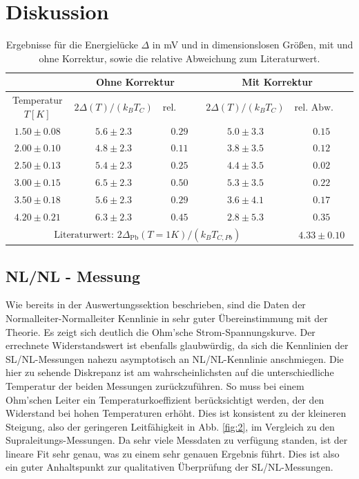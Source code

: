 \documentclass[twoside,        %
               BCOR12mm,       %
               english,ngerman, %
               fleqn,headsepline=false,footsepline=false
              ]{Vorlage/MFPREPORT}
\begin{document}
\section{Diskussion}
\begin{table}[!h]
    \centering
    \begin{tabular}{|c|c|c|c|c|}
        \hline
        &\multicolumn{2}{|c|}{Ohne Korrektur}&\multicolumn{2}{|c|}{Mit
        Korrektur}\\\hline
        Temperatur $T [K]$&$2\Delta(T)/(k_BT_C)$&$\text{rel. Abw. zum
        Lit. Wert}$&$2\Delta(T)/(k_BT_C)$&$\text{rel. Abw. zum
        Lit. Wert}$\\\hline
        $1.50\pm0.08$&$5.6\pm2.3$&$0.29$&$5.0\pm3.3$&$0.15$\\\hline
        $2.00\pm0.10$&$4.8\pm2.3$&$0.11$&$3.8\pm3.5$&$0.12$\\\hline
        $2.50\pm0.13$&$5.4\pm2.3$&$0.25$&$4.4\pm3.5$&$0.02$\\\hline
        $3.00\pm0.15$&$6.5\pm2.3$&$0.50$&$5.3\pm3.5$&$0.22$\\\hline
        $3.50\pm0.18$&$5.6\pm2.3$&$0.29$&$3.6\pm4.1$&$0.17$\\\hline
        $4.20\pm0.21$&$6.3\pm2.3$&$0.45$&$2.8\pm5.3$&$0.35$\\\hline\hline
        \multicolumn{4}{|c|}{$\text{Literaturwert: }
        2\Delta_{\text{Pb}}(T=1K)/(k_BT_{C,Pb})$}&$4.33\pm0.10$
        \cite{giaever1961study}\\\hline

    \end{tabular}
    \caption{Ergebnisse für die Energielücke $\Delta$ in mV und in
    dimensionslosen Größen, mit und ohne Korrektur, sowie die relative
    Abweichung zum Literaturwert.}
    \label{tab:res2}
\end{table}

\subsection{NL/NL - Messung}
Wie bereits in der Auswertungssektion beschrieben, sind die Daten der
Normalleiter-Normalleiter Kennlinie in sehr guter Übereinstimmung mit der
Theorie. Es zeigt sich deutlich die Ohm'sche Strom-Spannungskurve. Der
errechnete Widerstandswert ist ebenfalls glaubwürdig, da sich die Kennlinien der
SL/NL-Messungen nahezu asymptotisch an NL/NL-Kennlinie anschmiegen. Die hier zu
sehende Diskrepanz ist am wahrscheinlichsten auf die unterschiedliche
Temperatur der beiden Messungen zurückzuführen. So muss bei einem Ohm'schen
Leiter ein Temperaturkoeffizient berücksichtigt werden, der den Widerstand bei
hohen Temperaturen erhöht. Dies ist konsistent zu der kleineren Steigung, also
der geringeren Leitfähigkeit in Abb. \ref{fig:2}, im Vergleich zu den
Supraleitungs-Messungen. 
Da sehr viele Messdaten zu verfügung standen, ist der lineare Fit sehr genau,
was zu einem sehr genauen Ergebnis führt. Dies ist also ein guter Anhaltspunkt
zur qualitativen Überprüfung der SL/NL-Messungen.
\end{document}
